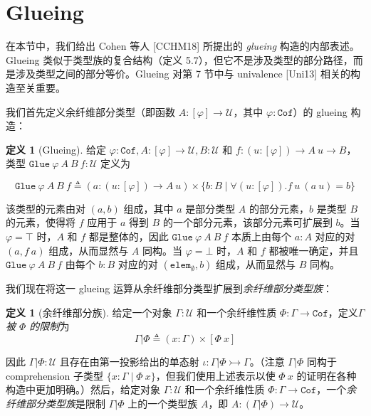 \documentclass{ctexart}
\theoremstyle{plain}
\theoremstyle{definition}
\newtheorem{definition}[theorem]{定义}
\theoremstyle{definition}
\theoremstyle{definition}
\theoremstyle{definition}
\numberwithin{equation}{section}
\begin{document}
\section{Glueing}

在本节中，我们给出 Cohen 等人 [CCHM18] 所提出的 \textit{glueing} 构造的内部表述。Glueing 类似于类型族的复合结构（定义 5.7），但它不是涉及类型的部分路径，而是涉及类型之间的部分等价。Glueing 对第 7 节中与 univalence [Uni13] 相关的构造至关重要。

我们首先定义余纤维部分类型（即函数 $ A : [\varphi] \to \mathcal{U} $，其中 $ \varphi : \mathtt{Cof} $）的 glueing 构造：

\begin{definition}[Glueing]
  给定 $ \varphi : \mathtt{Cof}, A : [\varphi] \to \mathcal{U}, B : \mathcal{U} $ 和 $ f : (u : [\varphi]) \to A\ u \to B $，类型 $ \mathtt{Glue}\ \varphi\ A\ B\ f : \mathcal{U} $ 定义为

\begin{equation} 
  \mathtt{Glue}\ \varphi\ A\ B\ f \triangleq (a : (u : [\varphi]) \to A\ u) \times \{b : B \mid \forall (u : [\varphi]). f\ u\ (a\ u) = b\}
\end{equation}
\end{definition}
该类型的元素由对 $ (a, b) $ 组成，其中 $ a $ 是部分类型 $ A $ 的部分元素，$ b $ 是类型 $ B $ 的元素，使得将 $ f $ 应用于 $ a $ 得到 $ B $ 的一个部分元素，该部分元素可扩展到 $ b $。当 $ \varphi = \top $ 时，$ A $ 和 $ f $ 都是整体的，因此 $ \mathtt{Glue}\ \varphi\ A\ B\ f $ 本质上由每个 $ a : A $ 对应的对 $ (a, f\ a) $ 组成，从而显然与 $ A $ 同构。当 $ \varphi = \bot $ 时，$ A $ 和 $ f $ 都被唯一确定，并且 $ \mathtt{Glue}\ \varphi\ A\ B\ f $ 由每个 $ b : B $ 对应的对 $ (\mathtt{elem}_{\emptyset}, b) $ 组成，从而显然与 $ B $ 同构。

我们现在将这一 glueing 运算从余纤维部分类型扩展到\textit{余纤维部分类型族}：

\begin{definition}[余纤维部分族]
  给定一个对象 $ \Gamma : \mathcal{U} $ 和一个余纤维性质 $ \Phi : \Gamma \to \mathtt{Cof} $，定义\textit{$ \Gamma $ 被 $ \Phi $ 的限制}为
\begin{equation}
\Gamma | \Phi \triangleq (x : \Gamma) \times [\Phi\ x]
\end{equation}
\end{definition}
因此 $ \Gamma | \Phi : \mathcal{U} $ 且存在由第一投影给出的单态射 $ \iota : \Gamma | \Phi \rightarrowtail \Gamma $。（注意 $ \Gamma | \Phi $ 同构于 comprehension 子类型 $ \{x : \Gamma \mid \Phi\ x\} $，但我们使用上述表示以使 $ \Phi\ x $ 的证明在各种构造中更加明确。）然后，给定对象 $ \Gamma : \mathcal{U} $ 和一个余纤维性质 $ \Phi : \Gamma \to \mathtt{Cof} $，一个\textit{余纤维部分类型族}是限制 $ \Gamma | \Phi $ 上的一个类型族 $ A $，即 $ A : (\Gamma | \Phi) \to \mathcal{U} $。
\end{document}
